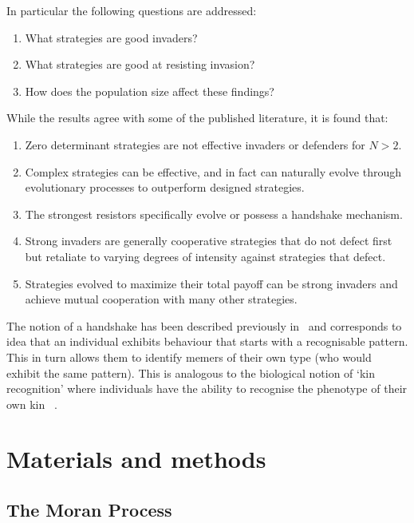 \documentclass[10pt,letterpaper]{article}
\begin{document}
In particular the following questions are addressed:
\begin{enumerate}
    \item What strategies are good invaders?
    \item What strategies are good at resisting invasion?
    \item How does the population size affect these findings?
\end{enumerate}

While the results agree with some of the published literature, it is found that:

\begin{enumerate}
 \item Zero determinant strategies are not effective invaders or defenders for $N > 2$.
 \item Complex strategies can be effective, and in fact can naturally evolve
     through evolutionary processes to outperform designed strategies.
 \item The strongest resistors specifically evolve or possess a handshake
     mechanism.
 \item Strong invaders are generally cooperative strategies that do not defect
 first but retaliate to varying degrees of intensity against strategies that defect.
 \item Strategies evolved to maximize their total payoff can be strong invaders
 and achieve mutual cooperation with many other strategies.
\end{enumerate}

The notion of a handshake has been described previously in~\cite{Robson1990} and
corresponds to idea that an individual exhibits behaviour that starts with a
recognisable pattern. This in turn allows them to identify memers of their own
type (who would exhibit the same pattern). This is analogous
to the biological notion of `kin recognition' where individuals have the ability
to recognise the phenotype of their own kin ~\cite{Mateo2003}.

\section*{Materials and methods}
\subsection*{The Moran Process}
\end{document}
